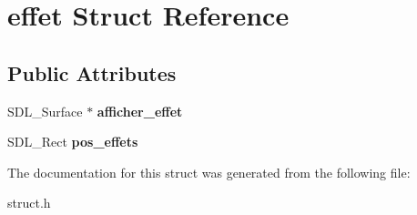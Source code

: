\hypertarget{structeffet}{}\section{effet Struct Reference}
\label{structeffet}
\subsection*{Public Attributes}
\begin{DoxyCompactItemize}
\item 
\mbox{\label{structeffet_a5c4766edeee5723ad1657b077663feff}} 
S\+D\+L\+\_\+\+Surface $\ast$ {\bfseries afficher\+\_\+effet}
\item 
\mbox{\label{structeffet_a4f43483ac7946cf3681208f4c738bf67}} 
S\+D\+L\+\_\+\+Rect {\bfseries pos\+\_\+effets}
\end{DoxyCompactItemize}


The documentation for this struct was generated from the following file\+:\begin{DoxyCompactItemize}
\item 
struct.\+h\end{DoxyCompactItemize}
